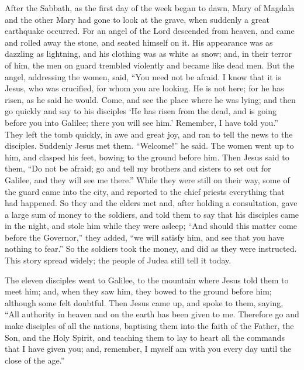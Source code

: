  After the Sabbath, as the first day of the week began to
dawn, Mary of Magdala and the other Mary had gone to look at the grave,
 when suddenly a great earthquake occurred. For an angel of
the Lord descended from heaven, and came and rolled away the stone, and
seated himself on it.  His appearance was as dazzling as
lightning, and his clothing was as white as snow;  and, in
their terror of him, the men on guard trembled violently and became like
dead men.  But the angel, addressing the women, said, ``You
need not be afraid. I know that it is Jesus, who was crucified, for whom
you are looking.  He is not here; for he has risen, as he
said he would. Come, and see the place where he was lying; 
and then go quickly and say to his disciples `He has risen from the
dead, and is going before you into Galilee; there you will see him.'
Remember, I have told you.''  They left the tomb quickly, in
awe and great joy, and ran to tell the news to the disciples.
 Suddenly Jesus met them. ``Welcome!'' he said. The women
went up to him, and clasped his feet, bowing to the ground before him.
Then Jesus said to them,  ``Do not be afraid; go and tell
my brothers and sisters to set out for Galilee, and they will see me
there.''  While they were still on their way, some of the
guard came into the city, and reported to the chief priests everything
that had happened.  So they and the elders met and, after
holding a consultation, gave a large sum of money to the soldiers,
 and told them to say that his disciples came in the night,
and stole him while they were asleep;  ``And should this
matter come before the Governor,'' they added, ``we will satisfy him,
and see that you have nothing to fear.''  So the soldiers
took the money, and did as they were instructed. This story spread
widely; the people of Judea still tell it today.

 The eleven disciples went to Galilee, to the mountain
where Jesus told them to meet him;  and, when they saw him,
they bowed to the ground before him; although some felt doubtful.
 Then Jesus came up, and spoke to them, saying, ``All
authority in heaven and on the earth has been given to me. 
Therefore go and make disciples of all the nations, baptising them into
the faith of the Father, the Son, and the Holy Spirit,  and
teaching them to lay to heart all the commands that I have given you;
and, remember, I myself am with you every day until the close of the
age.''

